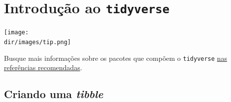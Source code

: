 \documentclass[
  11pt]{report}
\newcommand{\dir}{/ssd/R/x86_64-pc-linux-gnu-library/4.2/fnaufelRmd/rmarkdown/resources}
\newenvironment{rmdtip}
{
  \begin{mytip}
    \texttt{[image: \\dir/images/tip.png]}
    \tcblower
  }
  {
  \end{mytip}
}
\begin{document}
\hypertarget{introduuxe7uxe3o-ao-tidyverse}{%
\chapter{\texorpdfstring{Introdução ao \texttt{tidyverse}}{Introdução ao tidyverse}}\label{introduuxe7uxe3o-ao-tidyverse}}

\begin{rmdtip}
Busque mais informações sobre os pacotes que compõem o \texttt{tidyverse} \protect\hyperlink{refrec}{nas referências recomendadas}.

\end{rmdtip}

\hypertarget{criando-uma-tibble}{%
\section{\texorpdfstring{Criando uma \emph{tibble}}{Criando uma tibble}}\label{criando-uma-tibble}}
\end{document}
